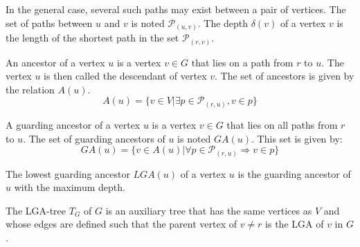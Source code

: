 
In the general case, several such paths may exist between a pair of vertices.
The set of paths between $u$ and $v$ is noted $\mathcal{P}_{(u,v)}$.
The depth $\delta(v)$ of a vertex $v$ is the length of the shortest path in the set $\mathcal{P}_{(r,v)}$.
\begin{definition}
	An ancestor of a vertex $u$ is a vertex $v \in G$ that lies on a path from $r$ to $u$. The vertex $u$ is then called the descendant of vertex $v$.
	The set of ancestors is given by the relation $A(u)$.
	\begin{equation*}
		A(u)=\{v\in V|\exists p\in \mathcal{P}_{(r,u)}, v \in p\}
	\end{equation*}
\end{definition}

\begin{definition}
	A guarding ancestor of a vertex $u$ is a vertex $v \in G$ that lies on all paths from $r$ to $u$.
	The set of guarding ancestors of $u$ is noted $\mathit{GA}(u)$.
	This set is given by:
	\begin{equation*}
		\mathit{GA}(u) =	\{v\in A(u)|\forall p\in \mathcal{P}_{(r,u)}\Rightarrow v\in p\}
	\end{equation*}
\end{definition}

\begin{definition}
	The lowest guarding ancestor $LGA(u)$ of a vertex $u$ is the guarding ancestor of $u$ with the maximum depth.
\end{definition}

\begin{definition}
	The LGA-tree $T_G$ of $G$  is an auxiliary tree that has the same vertices as $V$ and whose edges are defined such that the parent vertex of $v \neq r$ is the LGA of $v$ in $G$.
\end{definition}

